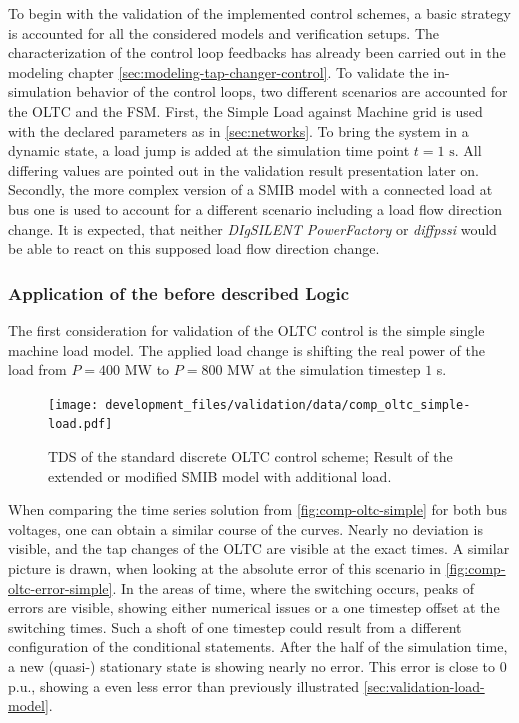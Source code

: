 To begin with the validation of the implemented control schemes, a basic strategy is accounted for all the considered models and verification setups.
The characterization of the control loop feedbacks has already been carried out in the modeling chapter \autoref{sec:modeling-tap-changer-control}.
To validate the in-simulation behavior of the control loops, two different scenarios are accounted for the \acs{OLTC} and the \acs{FSM}.
First, the Simple Load against Machine grid is used with the declared parameters as in \autoref{sec:networks}.
To bring the system in a dynamic state, a load jump is added at the simulation time point $t=1\text{ s}$.
All differing values are pointed out in the validation result presentation later on.
Secondly, the more complex version of a \acs{SMIB} model with a connected load at bus one is used to account for a different scenario including a load flow direction change.
It is expected, that neither \textit{DIgSILENT PowerFactory} or \textit{diffpssi} would be able to react on this supposed load flow direction change.

\subsubsection{Application of the before described Logic}

The first consideration for validation of the \acs{OLTC} control is the simple single machine load model.
The applied load change is shifting the real power of the load from $P=400\text{ MW}$ to $P=800\text{ MW}$ at the simulation timestep $1$ s.

\begin{figure}[htbp!]
    \centering
    \texttt{[image: development\_files/validation/data/comp\_oltc\_simple-load.pdf]}
    \caption[Time Domain Result of the OLTC control scheme applied on the extended \acs{SMIB} network]{\acf{TDS} of the standard discrete \acs{OLTC} control scheme; Result of the extended or modified \acs{SMIB} model with additional load.}
    \label{fig:comp-oltc-simple}
\end{figure}

When comparing the time series solution from \autoref{fig:comp-oltc-simple} for both bus voltages, one can obtain a similar course of the curves. 
Nearly no deviation is visible, and the tap changes of the \acs{OLTC} are visible at the exact times.
A similar picture is drawn, when looking at the absolute error of this scenario in \autoref{fig:comp-oltc-error-simple}.
In the areas of time, where the switching occurs, peaks of errors are visible, showing either numerical issues or a one timestep offset at the switching times.
Such a shoft of one timestep could result from a different configuration of the conditional statements.
After the half of the simulation time, a new (quasi-) stationary state is showing nearly no error.
This error is close to $0$ p.u., showing a even less error than previously illustrated \autoref{sec:validation-load-model}.

